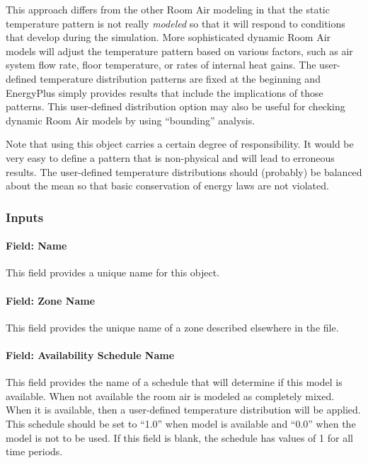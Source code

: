 This approach differs from the other Room Air modeling in that the static temperature pattern is not really \emph{modeled} so that it will respond to conditions that develop during the simulation. More sophisticated dynamic Room Air models will adjust the temperature pattern based on various factors, such as air system flow rate, floor temperature, or rates of internal heat gains. The user-defined temperature distribution patterns are fixed at the beginning and EnergyPlus simply provides results that include the implications of those patterns. This user-defined distribution option may also be useful for checking dynamic Room Air models by using ``bounding'' analysis.

Note that using this object carries a certain degree of responsibility. It would be very easy to define a pattern that is non-physical and will lead to erroneous results. The user-defined temperature distributions should (probably) be balanced about the mean so that basic conservation of energy laws are not violated.

\subsubsection{Inputs}\label{inputs-1-038}

\paragraph{Field: Name}\label{field-name-1-037}

This field provides a unique name for this object.

\paragraph{Field: Zone Name}\label{field-zone-name-1-008}

This field provides the unique name of a zone described elsewhere in the file.

\paragraph{Field: Availability Schedule Name}\label{field-availability-schedule-name-015}

This field provides the name of a schedule that will determine if this model is available. When not available the room air is modeled as completely mixed. When it is available, then a user-defined temperature distribution will be applied. This schedule should be set to ``1.0'' when model is available and ``0.0'' when the model is not to be used. If this field is blank, the schedule has values of 1 for all time periods.

